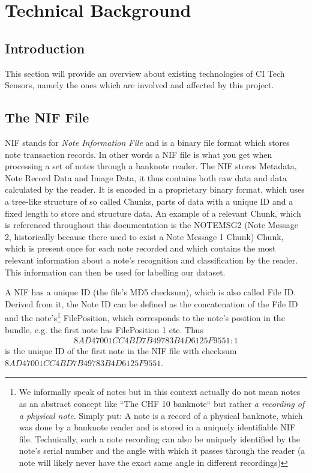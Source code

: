 \chapter{ Technical Background}
\label{chap:technicalbackground}

\section{Introduction}
This section will provide an overview about existing technologies of CI Tech Sensors, namely the ones which are involved and affected by this project.

\section{The NIF File}
NIF stands for \emph{Note Information File} and is a binary file format which stores note transaction records. In other words a NIF file is what you get when processing a set of notes through a banknote reader. The NIF stores Metadata, Note Record Data and Image Data, it thus contains both raw data and data calculated by the reader. It is encoded in a proprietary binary format, which uses a tree-like structure of so called Chunks, parts of data with a unique ID and a fixed length to store and structure data. An example of a  relevant Chunk, which is referenced throughout this documentation is the NOTEMSG2 (Note Message 2, historically because there used to exist a Note Message 1 Chunk) Chunk, which is present once for each note recorded and which contains the most relevant information about a note's recognition and classification by the reader. This information can then be used for labelling our dataset. \par
A NIF has a unique ID (the file's MD5 checksum), which is also called File ID. Derived from it, the Note ID can be defined as the concatenation of the File ID and the note's\footnote{We informally speak of notes but in this context actually do not mean notes as an abstract concept like ``The CHF 10 banknote`` but rather \emph{a recording of a physical note}. Simply put: A note is a record of a physical banknote, which was done by a banknote reader and is stored in a uniquely identifiable NIF file. Technically, such a note recording can also be uniquely identified by the note's serial number and the angle with which it passes through the reader (a note will likely never have the exact same angle in different recordings)} FilePosition, which corresponds to the note's position in the bundle, e.g. the first note has FilePosition 1 etc. Thus
\begin{align*}
8AD47001CC4BD7B49783B4D6125F9551:1
\end{align*}
is the unique ID of the first note in the NIF file with checksum $8AD47001CC4BD7B49783B4D6125F9551$.

